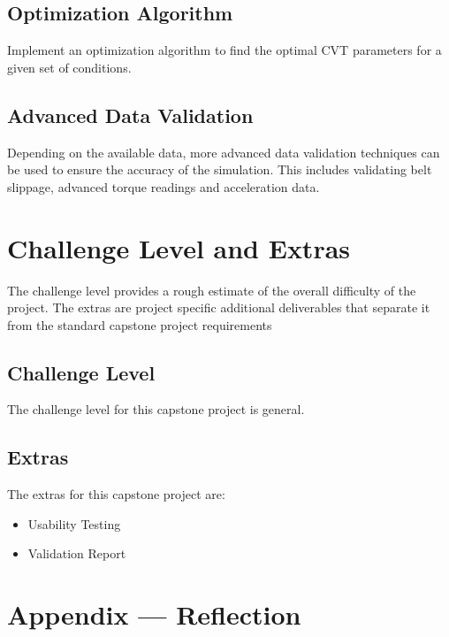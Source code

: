 \documentclass{article}
\begin{document}
\subsection{Optimization Algorithm}
Implement an optimization algorithm to find the optimal CVT parameters for a given set of 
conditions.

\subsection{Advanced Data Validation}
Depending on the available data, more advanced data validation techniques can be used to 
ensure the accuracy of the simulation. This includes validating belt slippage, advanced torque readings and 
acceleration data.

\section{Challenge Level and Extras}
The challenge level provides a rough estimate of the overall difficulty of the project.
The extras are project specific additional deliverables that separate it from the standard capstone project requirements

\subsection{Challenge Level}

The challenge level for this capstone project is general.

\subsection{Extras}
The extras for this capstone project are:
\begin{itemize}
    \item Usability Testing
    \item Validation Report
\end{itemize}


\newpage{}

\section*{Appendix --- Reflection}


\end{document}
